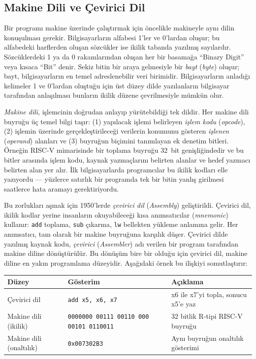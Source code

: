 \subsection{Makine Dili ve Çevirici Dil}
\label{subsec:makine-dili-cevirici}

Bir programı makine üzerinde çalıştırmak için öncelikle makineyle aynı dilin konuşulması gerekir. Bilgisayarların alfabesi 1'ler ve 0'lardan oluşur; bu alfabedeki harflerden oluşan sözcükler ise ikilik tabanda yazılmış sayılardır. Sözcüklerdeki 1 ya da 0 rakamlarından oluşan her bir basamağa ``Binary Digit'' veya kısaca ``Bit'' denir. Sekiz bitin bir araya gelmesiyle bir \emph{bayt} (\emph{byte}) oluşur; bayt, bilgisayarların en temel adreslenebilir veri birimidir. Bilgisayarların anladığı kelimeler 1 ve 0'lardan oluştuğu için üst düzey dilde yazılanların bilgisayar tarafından anlaşılması bunların ikilik düzene çevrilmesiyle mümkün olur.

\emph{Makine dili}, işlemcinin doğrudan anlayıp yürütebildiği tek dildir. Her makine dili buyruğu üç temel bilgi taşır: (1) yapılacak işlemi belirleyen \emph{işlem kodu} (\emph{opcode}), (2) işlemin üzerinde gerçekleştirileceği verilerin konumunu gösteren \emph{işlenen} (\emph{operand}) alanları ve (3) buyruğun biçimini tanımlayan ek denetim bitleri. Örneğin RISC-V mimarisinde bir toplama buyruğu 32~bit genişliğindedir ve bu bitler arasında işlem kodu, kaynak yazmaçlarını belirten alanlar ve hedef yazmacı belirten alan yer alır. İlk bilgisayarlarda programcılar bu ikilik kodları elle yazıyordu --- yüzlerce satırlık bir programda tek bir bitin yanlış girilmesi saatlerce hata aramayı gerektiriyordu.

Bu zorlukları aşmak için 1950'lerde \emph{çevirici dil} (\emph{Assembly}) geliştirildi. Çevirici dil, ikilik kodlar yerine insanların okuyabileceği kısa anımsatıcılar (\emph{mnemonic}) kullanır: \texttt{add} toplama, \texttt{sub} çıkarma, \texttt{lw} bellekten yükleme anlamına gelir. Her anımsatıcı, tam olarak bir makine buyruğuna karşılık düşer. Çevirici dilde yazılmış kaynak kodu, \emph{çevirici} (\emph{Assembler}) adı verilen bir program tarafından makine diline dönüştürülür. Bu dönüşüm bire bir olduğu için çevirici dil, makine diline en yakın programlama düzeyidir. Aşağıdaki örnek bu ilişkiyi somutlaştırır:

\begin{center}
\footnotesize
\begin{tabular}{@{}lll@{}}
\toprule
\textbf{Düzey} & \textbf{Gösterim} & \textbf{Açıklama} \\
\midrule
Çevirici dil & \texttt{add x5, x6, x7} & x6 ile x7'yi topla, sonucu x5'e yaz \\
Makine dili (ikilik) & \texttt{0000000\,00111\,00110\,000\,00101\,0110011} & 32 bitlik R-tipi RISC-V buyruğu \\
Makine dili (onaltılık) & \texttt{0x007302B3} & Aynı buyruğun onaltılık gösterimi \\
\bottomrule
\end{tabular}
\end{center}

